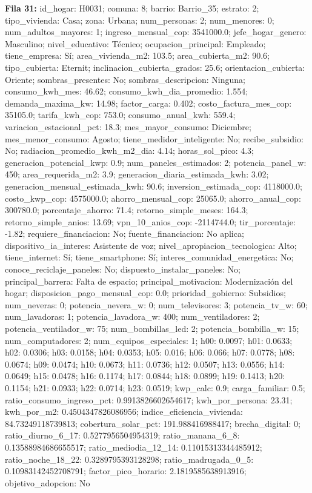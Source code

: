 {\footnotesize\textbf{Fila 31:} id\_hogar: H0031; comuna: 8; barrio: Barrio\_35; estrato: 2; tipo\_vivienda: Casa; zona: Urbana; num\_personas: 2; num\_menores: 0; num\_adultos\_mayores: 1; ingreso\_mensual\_cop: 3541000.0; jefe\_hogar\_genero: Masculino; nivel\_educativo: Técnico; ocupacion\_principal: Empleado; tiene\_empresa: Sí; area\_vivienda\_m2: 103.5; area\_cubierta\_m2: 90.6; tipo\_cubierta: Eternit; inclinacion\_cubierta\_grados: 25.6; orientacion\_cubierta: Oriente; sombras\_presentes: No; sombras\_descripcion: Ninguna; consumo\_kwh\_mes: 46.62; consumo\_kwh\_dia\_promedio: 1.554; demanda\_maxima\_kw: 14.98; factor\_carga: 0.402; costo\_factura\_mes\_cop: 35105.0; tarifa\_kwh\_cop: 753.0; consumo\_anual\_kwh: 559.4; variacion\_estacional\_pct: 18.3; mes\_mayor\_consumo: Diciembre; mes\_menor\_consumo: Agosto; tiene\_medidor\_inteligente: No; recibe\_subsidio: No; radiacion\_promedio\_kwh\_m2\_dia: 4.14; horas\_sol\_pico: 4.3; generacion\_potencial\_kwp: 0.9; num\_paneles\_estimados: 2; potencia\_panel\_w: 450; area\_requerida\_m2: 3.9; generacion\_diaria\_estimada\_kwh: 3.02; generacion\_mensual\_estimada\_kwh: 90.6; inversion\_estimada\_cop: 4118000.0; costo\_kwp\_cop: 4575000.0; ahorro\_mensual\_cop: 25065.0; ahorro\_anual\_cop: 300780.0; porcentaje\_ahorro: 71.4; retorno\_simple\_meses: 164.3; retorno\_simple\_anios: 13.69; vpn\_10\_anios\_cop: -2114744.0; tir\_porcentaje: -1.82; requiere\_financiacion: No; fuente\_financiacion: No aplica; dispositivo\_ia\_interes: Asistente de voz; nivel\_apropiacion\_tecnologica: Alto; tiene\_internet: Sí; tiene\_smartphone: Sí; interes\_comunidad\_energetica: No; conoce\_reciclaje\_paneles: No; dispuesto\_instalar\_paneles: No; principal\_barrera: Falta de espacio; principal\_motivacion: Modernización del hogar; disposicion\_pago\_mensual\_cop: 0.0; prioridad\_gobierno: Subsidios; num\_neveras: 0; potencia\_nevera\_w: 0; num\_televisores: 3; potencia\_tv\_w: 60; num\_lavadoras: 1; potencia\_lavadora\_w: 400; num\_ventiladores: 2; potencia\_ventilador\_w: 75; num\_bombillas\_led: 2; potencia\_bombilla\_w: 15; num\_computadores: 2; num\_equipos\_especiales: 1; h00: 0.0097; h01: 0.0633; h02: 0.0306; h03: 0.0158; h04: 0.0353; h05: 0.016; h06: 0.066; h07: 0.0778; h08: 0.0674; h09: 0.0474; h10: 0.0673; h11: 0.0736; h12: 0.0507; h13: 0.0556; h14: 0.0649; h15: 0.0478; h16: 0.1174; h17: 0.0844; h18: 0.0899; h19: 0.1413; h20: 0.1154; h21: 0.0933; h22: 0.0714; h23: 0.0519; kwp\_calc: 0.9; carga\_familiar: 0.5; ratio\_consumo\_ingreso\_pct: 0.9913826602654617; kwh\_por\_persona: 23.31; kwh\_por\_m2: 0.4504347826086956; indice\_eficiencia\_vivienda: 84.73249118739813; cobertura\_solar\_pct: 191.988416988417; brecha\_digital: 0; ratio\_diurno\_6\_17: 0.5277956504954319; ratio\_manana\_6\_8: 0.13588984686655517; ratio\_mediodia\_12\_14: 0.11015313344485912; ratio\_noche\_18\_22: 0.3289795393128298; ratio\_madrugada\_0\_5: 0.10983142452708791; factor\_pico\_horario: 2.1819585638913916; objetivo\_adopcion: No\par}
